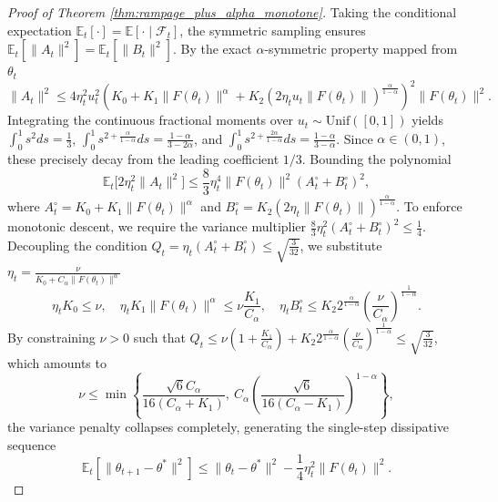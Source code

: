\documentclass[letter,11pt]{article}
\begin{document}
\begin{proof}[Proof of Theorem \ref{thm:rampage_plus_alpha_monotone}]
Taking the conditional expectation $\mathbb{E}_t[\cdot] = \mathbb{E}[\cdot \mid \mathcal{F}_t]$, the symmetric sampling ensures $\mathbb{E}_t[\|A_t\|^2] = \mathbb{E}_t[\|B_t\|^2]$. By the exact $\alpha$-symmetric property mapped from $\theta_t$
\begin{equation}
\|A_t\|^2 \le 4\eta_t^2 u_t^2 \left( K_0 + K_1 \|F(\theta_t)\|^\alpha + K_2 (2\eta_t u_t \|F(\theta_t)\|)^{\frac{\alpha}{1-\alpha}} \right)^2 \|F(\theta_t)\|^2.
\end{equation}
Integrating the continuous fractional moments over $u_t \sim \mathrm{Unif}([0,1])$ yields $\int_0^1 s^2 ds = \frac{1}{3}$, $\int_0^1 s^{2 + \frac{\alpha}{1-\alpha}} ds = \frac{1-\alpha}{3-2\alpha}$, and $\int_0^1 s^{2 + \frac{2\alpha}{1-\alpha}} ds = \frac{1-\alpha}{3-\alpha}$. Since $\alpha \in (0,1)$, these precisely decay from the leading coefficient $1/3$. Bounding the polynomial
\begin{equation}
\mathbb{E}_t\big[ 2\eta_t^2 \|A_t\|^2 \big] \le \frac{8}{3}\eta_t^4 \|F(\theta_t)\|^2 \left( A_t^\circ + B_t^\circ \right)^2,
\end{equation}
where $A_t^\circ = K_0 + K_1\|F(\theta_t)\|^\alpha$ and $B_t^\circ = K_2 (2\eta_t\|F(\theta_t)\|)^{\frac{\alpha}{1-\alpha}}$. To enforce monotonic descent, we require the variance multiplier $\frac{8}{3}\eta_t^2(A_t^\circ + B_t^\circ)^2 \le \frac{1}{4}$. Decoupling the condition $Q_t = \eta_t(A_t^\circ + B_t^\circ) \le \sqrt{\frac{3}{32}}$, we substitute $\eta_t = \frac{\nu}{K_0 + C_\alpha \|F(\theta_t)\|^\alpha}$
\begin{equation}
\eta_t K_0 \le \nu, \quad \eta_t K_1 \|F(\theta_t)\|^\alpha \le \nu \frac{K_1}{C_\alpha}, \quad \eta_t B_t^\circ \le K_2 2^{\frac{\alpha}{1-\alpha}} \left(\frac{\nu}{C_\alpha}\right)^{\frac{1}{1-\alpha}}.
\end{equation}
By constraining $\nu > 0$ such that $Q_t \le \nu \left( 1 + \frac{K_1}{C_\alpha} \right) + K_2 2^{\frac{\alpha}{1-\alpha}} \left(\frac{\nu}{C_\alpha}\right)^{\frac{1}{1-\alpha}} \le \sqrt{\frac{3}{32}}$, which amounts to
\begin{equation}
\nu \le \min \left\{ \frac{\sqrt{6} C_\alpha}{16(C_\alpha + K_1)}, \ C_\alpha \left( \frac{\sqrt{6}}{16(C_\alpha - K_1)} \right)^{1-\alpha} \right\},
\end{equation}
the variance penalty collapses completely, generating the single-step dissipative sequence
\begin{equation}
\mathbb{E}_t\left[\|\theta_{t+1} - \theta^*\|^2\right] \le \|\theta_t - \theta^*\|^2 - \frac{1}{4}\eta_t^2 \|F(\theta_t)\|^2.

\end{equation}
\end{proof}
\end{document}

